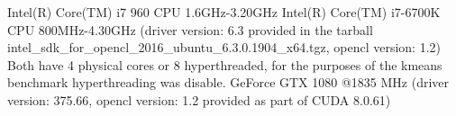 \documentclass[../document.tex]{subfiles}
\begin{document}
\label{ssec:hardware}

Intel(R) Core(TM) i7 960 CPU 1.6GHz-3.20GHz
Intel(R) Core(TM) i7-6700K CPU 800MHz-4.30GHz (driver version: 6.3 provided in the tarball intel_sdk_for_opencl_2016_ubuntu_6.3.0.1904_x64.tgz, opencl version: 1.2)
Both have 4 physical cores or 8 hyperthreaded, for the purposes of the kmeans benchmark hyperthreading was disable.
GeForce GTX 1080 @1835 MHz (driver version: 375.66, opencl version: 1.2 provided as part of CUDA 8.0.61)
\end{document}
